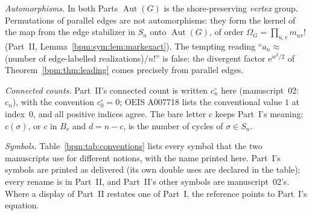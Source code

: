 \documentclass[11pt,a4paper]{article}
\theoremstyle{remark}\newtheorem{remark}[theorem]{Remark}%
\newcommand{\Aut}{\operatorname{Aut}}\newcommand{\ee}{\mathrm e}
\begin{document}
\emph{Automorphisms.} In both Parts $\Aut(G)$ is the shore-preserving
\emph{vertex} group. Permutations of parallel edges are not automorphisms:
they form the kernel of the map from the edge stabilizer in $S_n$ onto
$\Aut(G)$, of order $\Omega_G=\prod_{u,v}m_{uv}!$ (Part~II,
Lemma~\ref{bpm:sym:lem:markexact}). The tempting reading ``$a_n\approx$
(number of edge-labelled realizations)$/n!$'' is false: the divergent factor
$\ee^{w^2/2}$ of Theorem~\ref{bpm:thm:leading} comes precisely from
parallel edges.

\emph{Connected counts.} Part~II's connected count is written $c^\circ_n$
here (manuscript~02: $c_n$), with the convention $c^\circ_0=0$; OEIS A007718
lists the conventional value $1$ at index~$0$, and all positive indices
agree. The bare letter $c$ keeps Part~I's meaning: $c(\sigma)$, or $c$ in
$B_c$ and $d=n-c$, is the number of cycles of $\sigma\in S_n$.

\emph{Symbols.} Table~\ref{bpm:tab:conventions} lists every symbol that the
two manuscripts use for different notions, with the name printed here.
Part~I's symbols are printed as delivered (its own double uses are declared
in the table); every rename is in Part~II, and Part~II's other symbols are
manuscript~02's. Where a display of Part~II restates one of Part~I, the
reference points to Part~I's equation.
\end{document}
